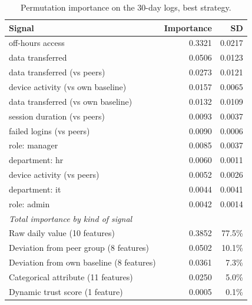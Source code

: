 \begin{table}[H]
\centering
\small
\begin{tabular}{lrr}
\toprule
Signal & Importance & SD \\
\midrule
off-hours access & 0.3321 & 0.0217 \\
data transferred & 0.0506 & 0.0123 \\
data transferred (vs peers) & 0.0273 & 0.0121 \\
device activity (vs own baseline) & 0.0157 & 0.0065 \\
data transferred (vs own baseline) & 0.0132 & 0.0109 \\
session duration (vs peers) & 0.0093 & 0.0037 \\
failed logins (vs peers) & 0.0090 & 0.0006 \\
role: manager & 0.0085 & 0.0037 \\
department: hr & 0.0060 & 0.0011 \\
device activity (vs peers) & 0.0052 & 0.0026 \\
department: it & 0.0044 & 0.0041 \\
role: admin & 0.0042 & 0.0014 \\
\midrule
\multicolumn{3}{l}{\textit{Total importance by kind of signal}} \\
\midrule
Raw daily value (10 features) & 0.3852 & 77.5\% \\
Deviation from peer group (8 features) & 0.0502 & 10.1\% \\
Deviation from own baseline (8 features) & 0.0361 & 7.3\% \\
Categorical attribute (11 features) & 0.0250 & 5.0\% \\
Dynamic trust score (1 feature) & 0.0005 & 0.1\% \\
\bottomrule
\end{tabular}
\caption{Permutation importance on the 30-day logs, best strategy.}
\label{tab:signal-importance}
\end{table}
